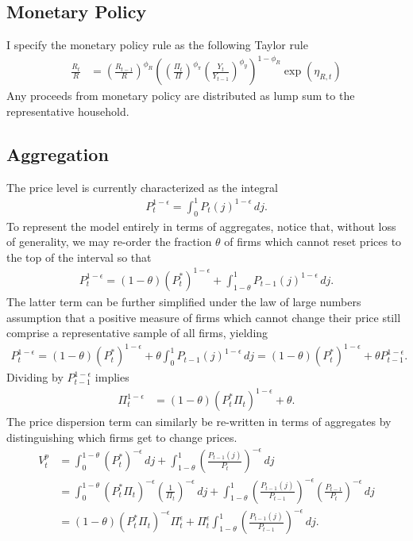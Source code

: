 \documentclass[12 pt, oneside]{article}
\theoremstyle{definition}
\theoremstyle{definition}
\theoremstyle{definition}
\begin{document}
\subsection{Monetary Policy}
I specify the monetary policy rule as the following Taylor rule
\begin{align}\label{eq:taylor rule}
  \frac{R_t}{R} & =  \left(\frac{R_{t - 1}}{R}\right)^{\phi_R}\left(\left(\frac{\Pi_t}{\Pi}\right)^{\phi_\pi}\left(\frac{Y_t}{Y_{t - 1}}\right)^{\phi_y}\right)^{1 - \phi_R}\exp(\eta_{R, t})
\end{align}
Any proceeds from monetary policy are distributed as lump sum to the representative household.

\subsection{Aggregation}
The price level is currently characterized as the integral
\begin{align*}
  P_t^{1 - \epsilon} = \int_0^1 P_t(j)^{1 - \epsilon}\, dj.
\end{align*}
To represent the model entirely in terms of aggregates, notice that, without loss of generality, we may re-order the fraction $\theta$ of firms which cannot reset prices to the top of the interval so that
\begin{align*}
  P_t^{1 - \epsilon} = (1 - \theta)(P_t^*)^{1 - \epsilon} +  \int_{1 - \theta}^1 P_{t - 1}(j)^{1 - \epsilon}\, dj.
\end{align*}
The latter term can be further simplified under the law of large numbers assumption that a positive measure of firms which cannot change their price
still comprise a representative sample of all firms, yielding
\begin{align*}
  P_t^{1 - \epsilon} = (1 - \theta)(P_t^*)^{1 - \epsilon} +  \theta\int_0^1 P_{t - 1}(j)^{1 - \epsilon}\, dj = (1 - \theta)(P_t^*)^{1 - \epsilon} +  \theta P_{t - 1}^{1 - \epsilon}.
\end{align*}
Dividing by $P_{t - 1}^{1 - \epsilon}$ implies
\begin{align}\label{eq:inflation from optimal reset price}
  \Pi_t^{ 1 - \epsilon} & = (1 - \theta) (P_t^*\Pi_t)^{1 - \epsilon} + \theta.
\end{align}
The price dispersion term can similarly be re-written in terms of aggregates by distinguishing which firms get to change prices.
\begin{align*}
  V_t^p & = \int_0^{1 - \theta}\left(P_t^*\right)^{ - \epsilon}\, dj + \int_{1 - \theta}^1 \left(\frac{P_{t - 1}(j)}{P_t}\right)^{ - \epsilon}\, dj\\
      & = \int_0^{1 - \theta}\left(P_t^*\Pi_t\right)^{ - \epsilon}\left(\frac{1}{\Pi_t}\right)^{ - \epsilon}\, dj + \int_{1 - \theta}^1 \left(\frac{P_{t - 1}(j)}{P_{t - 1}}\right)^{ - \epsilon}\left(\frac{P_{t - 1}}{P_t}\right)^{ - \epsilon}\, dj\\
      & = (1 - \theta) (P_t^*\Pi_t)^{-\epsilon} \Pi_t^{\epsilon}  + \Pi_t^{\epsilon} \int_{1 - \theta}^1 \left(\frac{P_{t - 1}(j)}{P_{t - 1}}\right)^{ - \epsilon}\,dj.
\end{align*}
\end{document}
